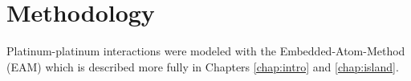 %
%

\section{Methodology}
Platinum-platinum interactions were modeled with the Embedded-Atom-Method (EAM)
which is described more fully in Chapters \ref{chap:intro} and
\ref{chap:island}.\citep{Foiles:1986ky}

